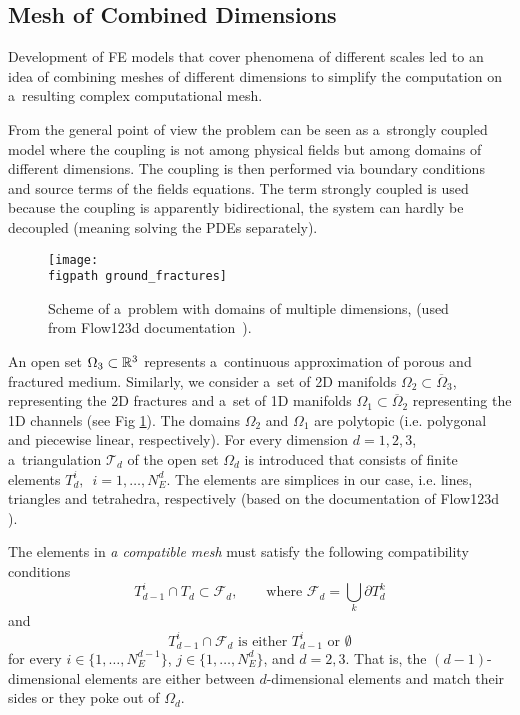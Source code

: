 \documentclass[FM,Dis]{tulthesis}
\newcommand{\figpath}{figures/}
\begin{document}
\subsection{Mesh of Combined Dimensions}
Development of FE models that cover phenomena of different scales led to an idea of combining meshes of
different dimensions to simplify the computation on a~resulting complex computational mesh.

From the general point of view the problem can be seen as a~strongly coupled model where the coupling is not
among physical fields but among domains of different dimensions. The coupling is then performed via boundary
conditions and source terms of the fields equations. The term strongly coupled is used because the coupling 
is apparently bidirectional, the system can hardly be decoupled (meaning solving the PDEs separately). 

\begin{figure}[h]
\centering
\texttt{[image: \\figpath ground\_fractures]}
\caption{
    \label{fig:multi-dim}
    Scheme of a~problem with domains of multiple dimensions, (used from Flow123d documentation~\cite{flow123d_doc_2015}).
}
\end{figure}

An open set $\Omega_{3} \subset {\mathbb{R}}^3$ represents a~continuous approximation of porous and fractured medium.
Similarly, we consider a~set of 2D manifolds $\Omega_2\subset\overline\Omega_3$, representing the 2D fractures and a~set of 1D manifolds $\Omega_1\subset \overline\Omega_2$ 
representing the 1D channels (see Fig \ref{fig:multi-dim}).
The domains $\Omega_2$ and $\Omega_1$ are polytopic (i.e. polygonal and piecewise linear, respectively).
For every dimension $d=1,2,3$, a~triangulation $\mathcal{T}_{d}$ of the open set $\Omega_d$
is introduced that consists of finite elements $T_{d}^{i},$\ $i = 1,\dots,N_{E}^{d}$.
The elements are simplices in our case, i.e. lines, triangles and tetrahedra, respectively 
(based on the documentation of Flow123d \cite{flow123d_doc_2015}).

The elements in \emph{a compatible mesh} must satisfy the following compatibility conditions
\begin{equation}
        T_{d-1}^i \cap T_d \subset \mathcal{F}_d,   \qquad \text{where } \mathcal{F}_d = \bigcup_{k} \partial T_{d}^{k}
\end{equation}
and
\begin{equation}
        T_{d-1}^i \cap \mathcal{F}_d    \text{ is either $T_{d-1}^i$ or $\emptyset$}    
\end{equation}
for every $i\in\{1,\dots, N_{E}^{d-1}\}$, $j\in\{1,\dots,N_{E}^{d}\}$,  and $d=2,3$. 
That is, the $(d-1)$-dimensional elements are either between $d$-dimensional elements and
match their sides or they poke out of $\Omega_d$. 
\end{document}
